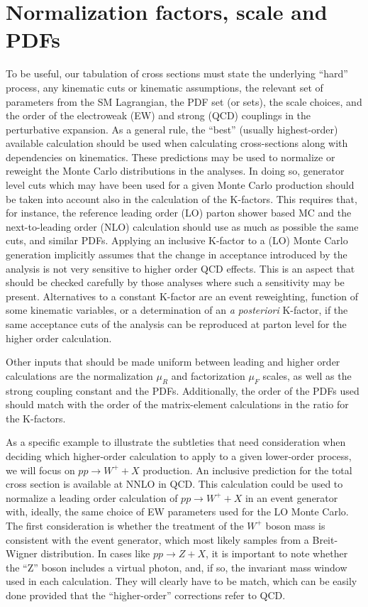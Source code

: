 \section{Normalization factors, scale and PDFs}
\label{sec:normalization}

To be useful, our tabulation of cross sections must state the
underlying ``hard'' process, any kinematic cuts or kinematic assumptions,
the relevant set of parameters from the SM Lagrangian, the PDF set (or sets),
the scale choices, and the order of the electroweak (EW) and strong (QCD)
couplings in the perturbative expansion.
As a general rule, the ``best'' (usually highest-order) available calculation should be used when 
calculating cross-sections along with dependencies on kinematics. These predictions
may be used to normalize or reweight the Monte Carlo distributions in the analyses.
In doing so, generator level cuts which may have been used for a given Monte Carlo 
production should be taken into account also in the calculation of the K-factors. 
This requires that, for instance, the 
reference leading order (LO) parton shower based MC and the next-to-leading order 
(NLO) calculation should use as much as possible the same cuts, and similar PDFs. 
Applying an inclusive K-factor to a (LO) Monte Carlo generation implicitly assumes
that the change in acceptance introduced by the analysis is not very sensitive 
to higher order QCD effects. This is an aspect that should be checked carefully
by those analyses where such a sensitivity may be present. Alternatives to a
constant K-factor are an event reweighting, function of some kinematic variables, 
or a determination of an {\it a posteriori} K-factor, if the same acceptance cuts 
of the analysis can be reproduced at parton level for the higher order calculation.

Other inputs that should be made uniform between leading and higher order 
calculations are the normalization $\mu_R$ and factorization $\mu_F$ scales,
as well as the strong coupling constant and the PDFs. 
Additionally, the order of the PDFs used should match with the order of the 
matrix-element calculations in the ratio for the K-factors.

As a specific example to illustrate the subtleties that need consideration when 
deciding which higher-order calculation to apply to a given lower-order process, 
we will focus on $pp\to W^+ + X$ production. An inclusive 
prediction for the total cross section is available at NNLO in QCD.
This calculation could be used to normalize a leading order calculation of 
$pp\to W^+ + X$ in an event generator with, ideally, the same choice of EW parameters 
used for the LO Monte Carlo. The first consideration is whether the treatment 
of the $W^+$ boson mass is consistent with the event generator, which most 
likely samples from a Breit-Wigner distribution. In cases like $pp\to Z+X$, it 
is important to note whether the ``Z'' boson includes a virtual photon, and, 
if so, the invariant mass window used in each calculation. They will clearly 
have to be match, which can be easily done provided that the ``higher-order'' 
corrections refer to QCD.


